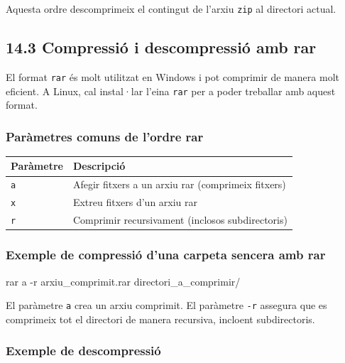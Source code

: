 \documentclass[
  12 pt,
  a4paper,
]{article}
\newenvironment{Shaded}{\begin{snugshade}}{\end{snugshade}}
\newcommand{\AttributeTok}[1]{\textcolor[rgb]{0.13,0.29,0.53}{#1}}
\newcommand{\ExtensionTok}[1]{#1}
\newcommand{\NormalTok}[1]{#1}
\begin{document}
Aquesta ordre descomprimeix el contingut de l'arxiu \texttt{zip} al
directori actual.

\subsection{14.3 Compressió i descompressió amb
rar}\label{compressiuxf3-i-descompressiuxf3-amb-rar}

El format \texttt{rar} és molt utilitzat en Windows i pot comprimir de
manera molt eficient. A Linux, cal instal·lar l'eina \texttt{rar} per a
poder treballar amb aquest format.

\subsubsection{Paràmetres comuns de l'ordre
rar}\label{paruxe0metres-comuns-de-lordre-rar}

\begin{longtable}[]{@{}ll@{}}
\toprule\noalign{}
Paràmetre & Descripció \\
\midrule\noalign{}
\endhead
\bottomrule\noalign{}
\endlastfoot
\texttt{a} & Afegir fitxers a un arxiu rar (comprimeix fitxers) \\
\texttt{x} & Extreu fitxers d'un arxiu rar \\
\texttt{r} & Comprimir recursivament (inclosos subdirectoris) \\
\end{longtable}

\subsubsection{Exemple de compressió d'una carpeta sencera amb
rar}\label{exemple-de-compressiuxf3-duna-carpeta-sencera-amb-rar}

\begin{Shaded}
\begin{Highlighting}[]
\ExtensionTok{rar}\NormalTok{ a }\AttributeTok{{-}r}\NormalTok{ arxiu\_comprimit.rar directori\_a\_comprimir/}
\end{Highlighting}
\end{Shaded}

El paràmetre \texttt{a} crea un arxiu comprimit. El paràmetre
\texttt{-r} assegura que es comprimeix tot el directori de manera
recursiva, incloent subdirectoris.

\subsubsection{Exemple de
descompressió}\label{exemple-de-descompressiuxf3}
\end{document}
